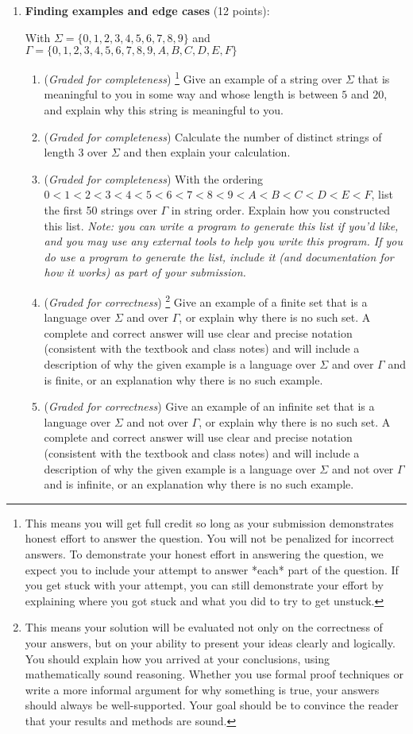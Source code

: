 \documentclass[12pt, oneside]{article}
\newcommand{\gradeCorrect}{({\it Graded for correctness}) }
\newcommand{\gradeCorrectFirst}{\gradeCorrect\footnote{This means your solution 
will be evaluated not only on the correctness of your answers, but on your ability
to present your ideas clearly and logically. You should explain how you 
arrived at your conclusions, using
mathematically sound reasoning. Whether you use formal proof techniques or 
write a more informal argument
for why something is true, your answers should always be well-supported. 
Your goal should be to convince the
reader that your results and methods are sound.} }
\newcommand{\gradeComplete}{({\it Graded for completeness}) }
\newcommand{\gradeCompleteFirst}{\gradeComplete\footnote{This means you will 
get full credit so long as your submission demonstrates honest effort to 
answer the question. You will not be penalized for incorrect answers. 
To demonstrate your honest effort in answering the question, we 
expect you to include your attempt to answer *each* part of the question. 
If you get stuck with your attempt, you can still demonstrate 
your effort by explaining where you got stuck and what 
you did to try to get unstuck.} }
\begin{document}
\begin{enumerate}[wide, labelwidth=!, labelindent=0pt]
\item\textbf{Finding examples and edge cases} (12 points):

With $\Sigma= \{0,1,2,3,4,5,6,7,8,9\}$
and $\Gamma = \{0,1,2, 3, 4, 5,6, 7, 8, 9, A, B, C, D, E, F\}$

    \begin{enumerate}
    \item\gradeCompleteFirst  Give an example of a string over $\Sigma$ that is meaningful to you in some way
    and whose length is between $5$ and $20$, and explain 
    why this string is meaningful to you.

    \item\gradeComplete Calculate the number of distinct strings of length 3 over $\Sigma$ and then 
     explain your calculation.

    \item\gradeComplete With the ordering $0 < 1 < 2 < 3 < 4< 5< 6< 7 < 8 < 9< A < B < C < D< E< F$, 
    list the first 50 strings over $\Gamma$ in string order. Explain how you constructed this list.
    {\it Note: you can write a program
    to generate this list if you'd like, and you may use any external tools to help you write this program.
    If you do use a program to generate the list, include it (and documentation for how it works) as part of your
    submission.}

    \item\gradeCorrectFirst Give an example of a finite set that is a language over $\Sigma$ and over $\Gamma$, 
    or explain why there is no such set. A complete and correct answer will use clear and precise notation 
    (consistent with the textbook and class notes) and will include a description of why the given example 
    is a language over $\Sigma$ and over $\Gamma$ and is finite, or an explanation why there is no such example.
    
    \item\gradeCorrect Give an example of an infinite set that is a language over $\Sigma$  and not over $\Gamma$, 
    or explain why there is no such set. A complete and correct answer will use clear and precise notation
    (consistent with the textbook and class notes) and will include a description of why the given example 
    is a language over $\Sigma$ and not over $\Gamma$ and is infinite, or an explanation why there is no such example.

    \end{enumerate}


\end{enumerate}
\end{document}
